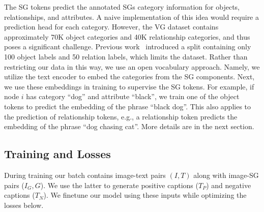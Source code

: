 \documentclass[11pt]{article}
\newcommand{\Ig}{I_G}
\newcommand{\minisection}[1]{\noindent{\textbf{#1}.}}
\begin{document}
\minisection{Open Vocabulary SG Prediction} The SG tokens predict the annotated SGs category information for objects, relationships, and attributes. A naive implementation of this idea would require a prediction head for each category. However, the VG dataset contains approximately 70K object categories and 40K relationship categories, and thus poses a significant challenge. Previous work~\cite{sg_generation_msg_pass} introduced a split containing only 100 object labels and 50 relation labels, which limits the dataset. Rather than restricting our data in this way, we use an open vocabulary approach. Namely, we utilize the text encoder to embed the categories from the SG components. Next, we use these embeddings in training to supervise the SG tokens. For example, if node $i$ has category ``dog'' and attribute ``black'', we train one of the object tokens to predict the embedding of the phrase ``black dog''. This also applies to the prediction of relationship tokens, e.g., a relationship token predicts the embedding of the phrase ``dog chasing cat''. More details are in the next section. 











\subsection{Training and Losses}
\label{sec:model:training}




During training our batch contains image-text pairs $(I,T)$ along with image-SG pairs ($\Ig,G$). We use the latter to generate positive captions ($T_P$) and negative captions ($T_N$). We finetune our model using these inputs while optimizing the losses below.
\end{document}
